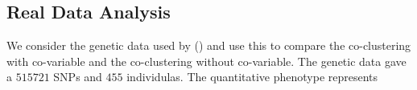 \documentclass[a4paper]{article}
\begin{document}


 \subsection{Real Data Analysis}\label{subsec:RealData}

We consider the genetic data used by (\cite{loucoubar2016detecting}) and use this to compare the co-clustering with co-variable
and the co-clustering without co-variable. 
The genetic data gave a $515721$ SNPs and $455$ individulas. The quantitative phenotype represents
\end{document}
